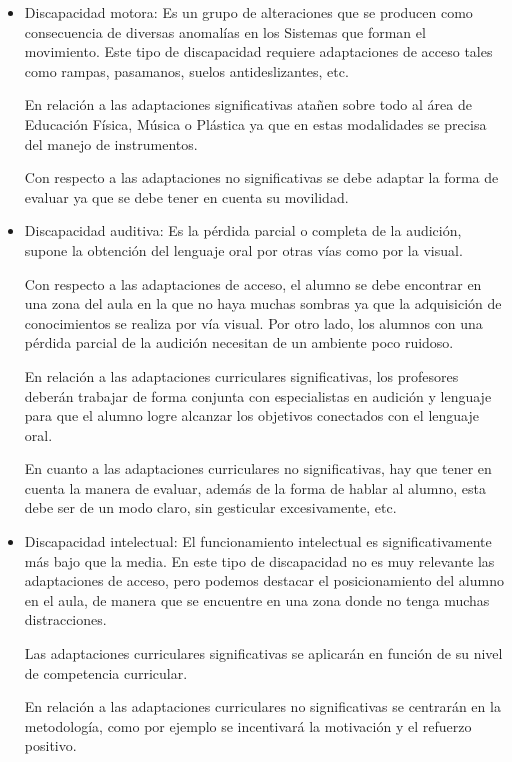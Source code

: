 \begin{itemize}
    \item Discapacidad motora: Es un grupo de alteraciones que se producen como consecuencia de diversas anomalías en los Sistemas que forman el movimiento. Este tipo de discapacidad requiere  adaptaciones de acceso tales como rampas, pasamanos, suelos antideslizantes, etc.

          En relación a las adaptaciones significativas atañen sobre todo al área de Educación Física, Música o Plástica ya que en estas modalidades se precisa del manejo de instrumentos.

          Con respecto a las adaptaciones no significativas se debe adaptar la forma de evaluar ya que se debe tener en cuenta su movilidad.

    \item Discapacidad auditiva: Es la pérdida parcial o completa de la audición, supone la obtención del lenguaje oral por otras vías como por la visual.

          Con respecto a las adaptaciones de acceso, el alumno se debe encontrar en una zona del aula en la que no haya muchas sombras ya que la adquisición de conocimientos se realiza por vía visual. Por otro lado, los alumnos con una pérdida parcial de la audición necesitan de un ambiente poco ruidoso.

          En relación a las adaptaciones curriculares significativas, los profesores deberán trabajar de forma conjunta con especialistas en audición y lenguaje para que el alumno logre alcanzar los objetivos conectados con el lenguaje oral.

          En cuanto a las adaptaciones curriculares no significativas, hay que tener en cuenta la manera de evaluar, además de la forma de hablar al alumno, esta debe ser de un modo claro, sin gesticular excesivamente, etc.

    \item Discapacidad intelectual: El funcionamiento intelectual es significativamente más bajo que la media. En este tipo de discapacidad no es muy relevante las adaptaciones de acceso, pero podemos destacar el posicionamiento del alumno en el aula, de manera que se encuentre en una zona donde no tenga muchas distracciones.

          Las adaptaciones curriculares significativas se aplicarán en función de su nivel de competencia curricular.

          En relación a las adaptaciones curriculares no significativas se centrarán en la metodología, como por ejemplo se incentivará la motivación y el refuerzo positivo.


\end{itemize}
